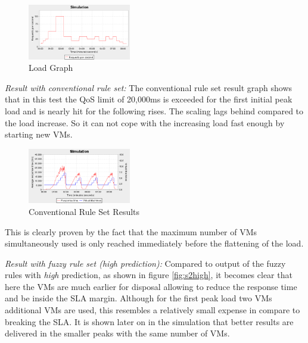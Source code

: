 \begin{figure}[ht]
\begin{center}
\includegraphics[width=0.40\textwidth]{fig/S2_Load.png}
\end{center}
\caption{Load Graph}
\label{fig:s2load}
\end{figure}

\textit{Result with conventional rule set:} The conventional rule set result graph shows that in this test the QoS limit of 20,000ms is exceeded for the first initial peak load and is nearly hit for the following rises. The scaling lags behind compared to the load increase. So it can not cope with the increasing load fast enough by starting new VMs. 
\begin{figure}[ht]
\begin{center}
\includegraphics[width=0.40\textwidth]{fig/Testreihe2/01_normal.png}
\end{center}
\caption{Conventional Rule Set Results}
\label{fig:s2normal}
\end{figure}
This is clearly proven by the fact that the maximum number of VMs simultaneously used is only reached immediately before the flattening of the load.  
 
\textit{Result with fuzzy rule set (high prediction):} Compared to output of the fuzzy rules with \textit{high} prediction, as shown in figure \ref{fig:s2high}, it becomes clear that here the VMs are much earlier for disposal allowing to reduce the response time and be inside the SLA margin. Although for the first peak load two VMs additional VMs are used, this resembles a relatively small expense in compare to breaking the SLA. It is shown later on in the simulation that better results are delivered in the smaller peaks with the same number of VMs.

